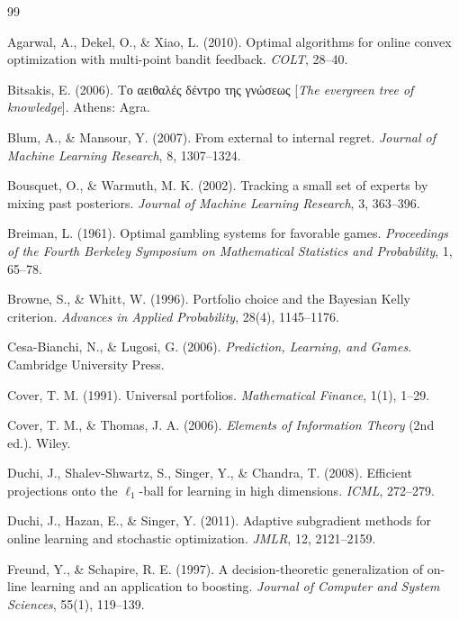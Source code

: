 \documentclass[12pt,a4paper,oneside]{report}
\renewcommand{\_}{\oldunderscore\allowbreak}
\theoremstyle{definition}
\theoremstyle{plain}
\theoremstyle{definition}   %
\begin{document}
\begin{thebibliography}{99}

 Agarwal, A., Dekel, O., \& Xiao, L. (2010). Optimal algorithms for
online convex optimization with multi-point bandit feedback. \emph{COLT}, 28--40.

 Bitsakis, E. (2006). \textgreek{Το αειθαλές δέντρο της
γνώσεως} [\emph{The evergreen tree of knowledge}]. Athens: Agra.

 Blum, A., \& Mansour, Y. (2007). From external to internal regret.
\emph{Journal of Machine Learning Research}, 8, 1307--1324.

 Bousquet, O., \& Warmuth, M. K. (2002). Tracking a small set of
experts by mixing past posteriors. \emph{Journal of Machine Learning Research}, 3, 363--396.

 Breiman, L. (1961). Optimal gambling systems for favorable games.
\emph{Proceedings of the Fourth Berkeley Symposium on Mathematical Statistics and
Probability}, 1, 65--78.

 Browne, S., \& Whitt, W. (1996). Portfolio choice and the Bayesian
Kelly criterion. \emph{Advances in Applied Probability}, 28(4), 1145--1176.

 Cesa-Bianchi, N., \& Lugosi, G. (2006).
\emph{Prediction, Learning, and Games}. Cambridge University Press.

 Cover, T. M. (1991). Universal portfolios.
\emph{Mathematical Finance}, 1(1), 1--29.

 Cover, T. M., \& Thomas, J. A. (2006). \emph{Elements of Information
Theory} (2nd ed.). Wiley.

 Duchi, J., Shalev-Shwartz, S., Singer, Y., \& Chandra, T. (2008).
Efficient projections onto the $\ell_1$-ball for learning in high dimensions.
\emph{ICML}, 272--279.

 Duchi, J., Hazan, E., \& Singer, Y. (2011). Adaptive subgradient methods
for online learning and stochastic optimization. \emph{JMLR}, 12, 2121--2159.

 Freund, Y., \& Schapire, R. E. (1997). A decision-theoretic
generalization of on-line learning and an application to boosting. \emph{Journal of Computer
and System Sciences}, 55(1), 119--139.


\end{thebibliography}
\end{document}
